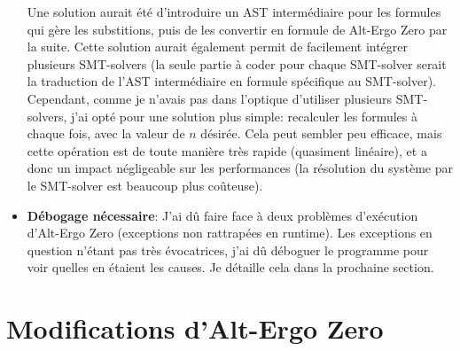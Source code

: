 \documentclass[a4paper]{article}%
\begin{document}
\begin{itemize}
		Une solution aurait été d'introduire un AST intermédiaire pour les formules qui gère les substitions, puis de les convertir en formule de Alt-Ergo Zero par la suite.
		Cette solution aurait également permit de facilement intégrer plusieurs SMT-solvers (la seule partie à coder pour chaque SMT-solver serait la traduction de l'AST intermédiaire
		en formule spécifique au SMT-solver). Cependant, comme je n'avais pas dans l'optique d'utiliser plusieurs SMT-solvers, j'ai opté pour une solution plus simple:
		recalculer les formules à chaque fois, avec la valeur de $n$ désirée. Cela peut sembler peu efficace, mais cette opération est de toute manière très rapide
		(quasiment linéaire), et a donc un impact négligeable sur les performances (la résolution du système par le SMT-solver est beaucoup plus coûteuse).\\
		\item \textbf{Débogage nécessaire}: J'ai dû faire face à deux problèmes d'exécution d'Alt-Ergo Zero (exceptions non rattrapées en runtime). Les exceptions en question n'étant pas
		très évocatrices, j'ai dû déboguer le programme pour voir quelles en étaient les causes. Je détaille cela dans la prochaine section.
	\end{itemize}

	\section{Modifications d'Alt-Ergo Zero}
\end{document}
